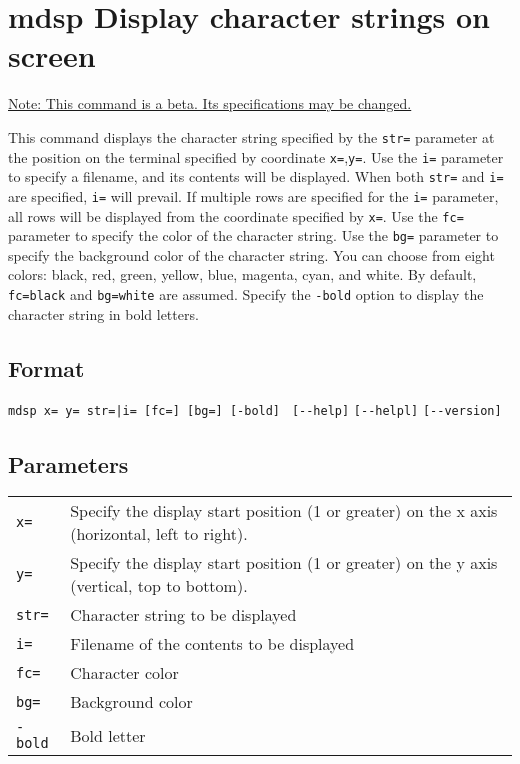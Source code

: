 

%

\section{mdsp Display character strings on screen\label{sect:mdsp}}
\underline{Note: This command is a beta. Its specifications may be changed.}

This command displays the character string specified by the \verb|str=| parameter at the position on the terminal specified by coordinate \verb|x=|,\verb|y=|. Use the \verb|i=| parameter to specify a filename, and its contents will be displayed. When both \verb|str=| and \verb|i=| are specified, \verb|i=| will prevail. If multiple rows are specified for the \verb|i=| parameter, all rows will be displayed from the coordinate specified by \verb|x=|.
Use the \verb|fc=| parameter to specify the color of the character string. Use the \verb|bg=| parameter to specify the background color of the character string. You can choose from eight colors: black, red, green, yellow, blue, magenta, cyan, and white. By default, \verb|fc=black| and \verb|bg=white| are assumed. Specify the \verb|-bold| option to display the character string in bold letters.

\subsection*{Format}
\verb/mdsp x= y= str=|i= [fc=] [bg=] [-bold] /
\verb|[--help]|
\verb|[--helpl]|
\verb|[--version]|\\

\subsection*{Parameters}
\begin{table}[htbp]
{\small
\begin{tabular}{ll}
\verb|x=|   & Specify the display start position (1 or greater) on the x axis (horizontal, left to right).\\
\verb|y=|   & Specify the display start position (1 or greater) on the y axis (vertical, top to bottom).\\
\verb|str=| & Character string to be displayed\\
\verb|i=|   & Filename of the contents to be displayed\\
\verb|fc=|  & Character color\\
\verb|bg=|  & Background color\\
\verb|-bold|& Bold letter\\
\end{tabular} 
}
\end{table} 


